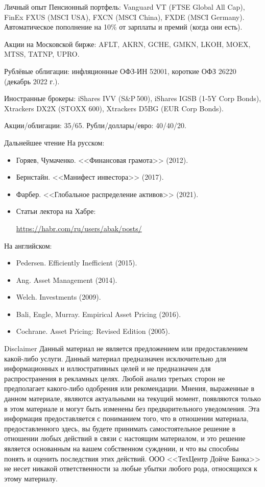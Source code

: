 \documentclass{beamer}
\newcommand{\insertdisclaimerframe}{
		\begin{frame}{Disclaimer}
			\small
			\justify
			Данный материал не является предложением или предоставлением
			какой-либо услуги. Данный материал предназначен исключительно для
			информационных и иллюстративных целей и не предназначен для
			распространения в рекламных целях. Любой анализ третьих сторон не 		
			предполагает какого-либо одобрения или рекомендации. Мнения, 
			выраженные в	данном материале, являются актуальными на текущий момент,
			появляются только в этом материале и могут быть изменены без 
			предварительного уведомления. Эта информация предоставляется с 
			пониманием того, что в отношении материала, предоставленного здесь, вы
			будете принимать самостоятельное решение в отношении любых действий в
			связи с настоящим материалом, и это решение является основанным на 
			вашем	собственном суждении, и что вы способны понять и оценить 
			последствия этих действий. ООО <<ТехЦентр Дойче Банка>> не несет 
			никакой ответственности за любые убытки любого рода, относящихся к
			 этому материалу.
		\end{frame}
	}
\newcommand{\insertdisclaimerframe}{
	}
\begin{document}
\begin{frame}{Личный опыт}
\justify
Пенсионный портфель: Vanguard VT (FTSE Global All Cap), FinEx FXUS (MSCI USA), FXCN (MSCI China), FXDE (MSCI Germany). Автоматическое пополнение на 10\% от зарплаты и премий (когда они есть).

\justify
Акции на Московской бирже: AFLT, AKRN, GCHE, GMKN, LKOH, MOEX, MTSS, TATNP, UPRO.

\justify
Рублёвые облигации: инфляционные ОФЗ-ИН 52001, короткие ОФЗ 26220 (декабрь 2022 г.).

\justify
Иностранные брокеры: iShares IVV (S\&P\,500), iShares IGSB (1-5Y Corp Bonds), Xtrackers 
DX2X (STOXX 600), Xtrackers D5BG (EUR Corp Bonds).

\justify
Акции/облигации: 35/65. Рубли/доллары/евро: 40/40/20.
\end{frame}



\begin{frame}{Дальнейшее чтение}
На русском:
\begin{itemize}
\justifying
\item Горяев, Чумаченко. <<Финансовая грамота>> (2012).
\item Бернстайн. <<Манифест инвестора>> (2017).
\item Фарбер. <<Глобальное распределение активов>> (2021).
\item Статьи лектора на Хабре:

\url{https://habr.com/ru/users/abak/posts/}
\end{itemize}
На английском:
\begin{itemize}
\item Pedersen. Efficiently Inefficient (2015).
\item Ang. Asset Management (2014).
\item Welch. Investments (2009).
\item Bali, Engle, Murray. Empirical Asset Pricing (2016).
\item Cochrane. Asset Pricing: Revised Edition (2005).

\end{itemize}
\end{frame}


\insertdisclaimerframe
\end{document}
